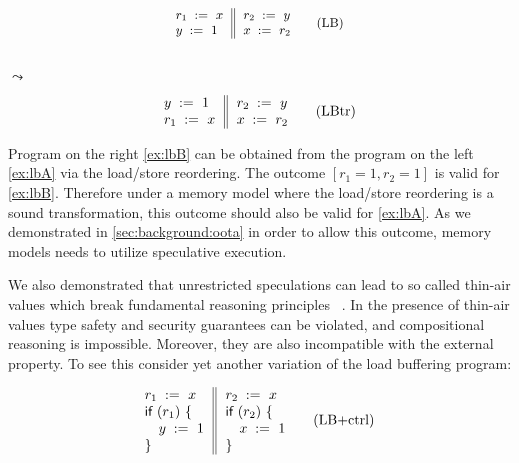 \begin{minipage}{0.43\linewidth}
\begin{equation*}
\small
\inarrII{
  \readInst{}{r_1}{x}     \\
  \writeInst{}{y}{1}      \\
}{
  \readInst{}{r_2}{y}     \\
  \writeInst{}{x}{r_2}    \\
}
\tag{LB}\label{ex:lbA}
\end{equation*}
\end{minipage}\hfill%
\begin{minipage}{0.09\linewidth}
\Large~\\ $\leadsto$
\end{minipage}\hfill%
\begin{minipage}{0.43\linewidth}
\begin{equation*}
\inarrII{
  \writeInst{}{y}{1}      \\
  \readInst{}{r_1}{x}     \\
}{
  \readInst{}{r_2}{y}     \\
  \writeInst{}{x}{r_2}    \\
}
\tag{LBtr}\label{ex:lbB}
\end{equation*}
\end{minipage}

Program on the right \ref{ex:lbB} can be obtained 
from the program on the left \ref{ex:lbA}
via the load/store reordering.
The outcome ${[r_1=1, r_2=1]}$ is valid for \ref{ex:lbB}.
Therefore under a memory model where the load/store reordering 
is a sound transformation, 
this outcome should also be valid for \ref{ex:lbA}.
As we demonstrated in \cref{sec:background:oota}
in order to allow this outcome, 
memory models needs to utilize speculative execution.

We also demonstrated that unrestricted speculations 
can lead to so called thin-air values which 
break fundamental reasoning principles~%
\cite{Boehm-Demsky:MSPC14, Batty-al:ESOP15}.
In the presence of thin-air values
type safety and security guarantees can be violated, 
and compositional reasoning is impossible.
Moreover, they are also incompatible with 
the external \DRF property.
To see this consider yet another variation of 
the load buffering program:

\begin{equation*}
\inarrII{
  \readInst{}{r_1}{x}      \\
  \kw{if} {(r_1)} ~\{      \\
  \quad\writeInst{}{y}{1}  \\
  \}
}{
  \readInst{}{r_2}{x}      \\
  \kw{if} {(r_2)} ~\{      \\
  \quad\writeInst{}{x}{1}  \\
  \}
}
\tag{LB+ctrl}\label{ex:lb+ctrl}
\end{equation*}

